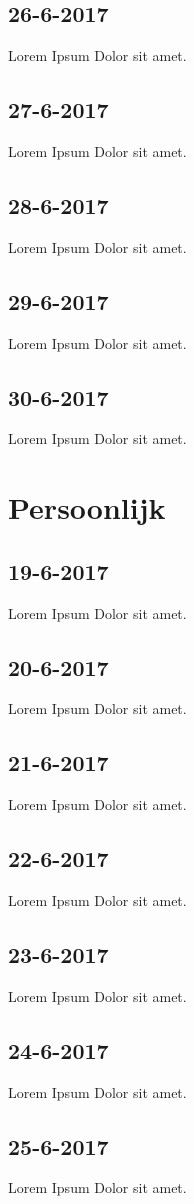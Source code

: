 \documentclass{uva-inf-article}
\begin{document}
\subsection{26-6-2017}
Lorem Ipsum Dolor sit amet.
\subsection{27-6-2017}
Lorem Ipsum Dolor sit amet.
\subsection{28-6-2017}
Lorem Ipsum Dolor sit amet.
\subsection{29-6-2017}
Lorem Ipsum Dolor sit amet.
\subsection{30-6-2017}
Lorem Ipsum Dolor sit amet.

\section{Persoonlijk}
\subsection{19-6-2017}
Lorem Ipsum Dolor sit amet.
\subsection{20-6-2017}
Lorem Ipsum Dolor sit amet.
\subsection{21-6-2017}
Lorem Ipsum Dolor sit amet.
\subsection{22-6-2017}
Lorem Ipsum Dolor sit amet.
\subsection{23-6-2017}
Lorem Ipsum Dolor sit amet.
\subsection{24-6-2017}
Lorem Ipsum Dolor sit amet.
\subsection{25-6-2017}
Lorem Ipsum Dolor sit amet.
\end{document}
